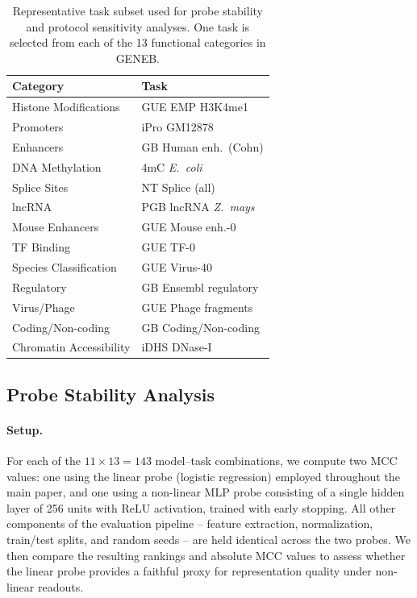 \documentclass{llmxive}
\begin{document}
\begin{table}[!htbp]
\centering
\small
\begin{tabular}{@{}ll@{}}
\toprule
\textbf{Category} & \textbf{Task} \\
\midrule
Histone Modifications     & GUE EMP H3K4me1 \\
Promoters                 & iPro GM12878 \\
Enhancers                 & GB Human enh.\ (Cohn) \\
DNA Methylation           & 4mC \emph{E.\ coli} \\
Splice Sites              & NT Splice (all) \\
lncRNA                    & PGB lncRNA \emph{Z.\ mays} \\
Mouse Enhancers           & GUE Mouse enh.-0 \\
TF Binding                & GUE TF-0 \\
Species Classification    & GUE Virus-40 \\
Regulatory                & GB Ensembl regulatory \\
Virus/Phage               & GUE Phage fragments \\
Coding/Non-coding         & GB Coding/Non-coding \\
Chromatin Accessibility   & iDHS DNase-I \\
\bottomrule
\end{tabular}
\caption{Representative task subset used for probe stability and protocol
sensitivity analyses. One task is selected from each of the 13 functional
categories in GENEB.}
\label{tab:stability_tasks_unique}
\end{table}

\subsection{Probe Stability Analysis}
\label{subsec:probe_stability}

\paragraph{Setup.}
For each of the $11 \times 13 = 143$ model--task combinations, we compute
two MCC values: one using the linear probe (logistic regression) employed
throughout the main paper, and one using a non-linear MLP probe consisting
of a single hidden layer of 256 units with ReLU activation, trained with
early stopping. All other components of the evaluation pipeline -- feature
extraction, normalization, train/test splits, and random seeds -- are held
identical across the two probes. We then compare the resulting rankings
and absolute MCC values to assess whether the linear probe provides a
faithful proxy for representation quality under non-linear readouts.
\end{document}
